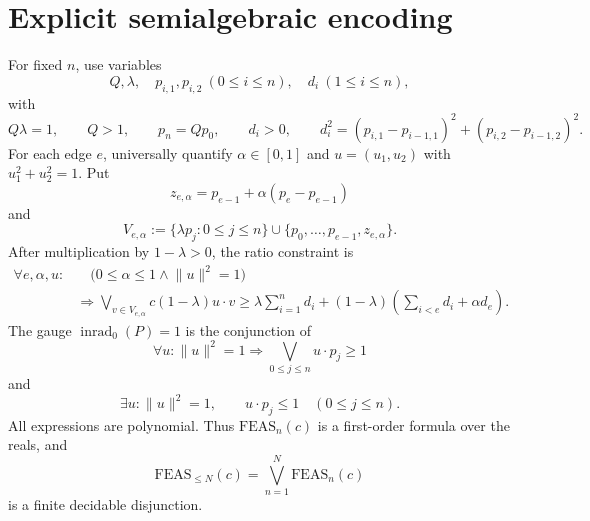 \documentclass[10pt,a4paper]{article}
\theoremstyle{definition}
\theoremstyle{remark}
\DeclareMathOperator{\inrad}{inrad}
\newcommand{\norm}[1]{\lVert #1\rVert}
\begin{document}
\section{Explicit semialgebraic encoding}
\label{app:semialgebraic}
For fixed $n$, use variables
\[
Q,\lambda,
\quad
p_{i,1},p_{i,2}\ (0\le i\le n),
\quad
d_i\ (1\le i\le n),
\]
with
\[
Q\lambda=1,
\qquad
Q>1,
\qquad
p_n=Qp_0,
\qquad
d_i>0,
\qquad
d_i^2=(p_{i,1}-p_{i-1,1})^2+(p_{i,2}-p_{i-1,2})^2.
\]
For each edge $e$, universally quantify $\alpha\in[0,1]$ and $u=(u_1,u_2)$ with $u_1^2+u_2^2=1$. Put
\[
z_{e,\alpha}=p_{e-1}+\alpha(p_e-p_{e-1})
\]
and
\[
V_{e,\alpha}:=
\{\lambda p_j:0\le j\le n\}
\cup
\{p_0,\ldots,p_{e-1},z_{e,\alpha}\}.
\]
After multiplication by $1-\lambda>0$, the ratio constraint is
\begin{align*}
\forall e,\alpha,u:
&\quad
\bigl(0\le\alpha\le1\wedge\norm{u}^2=1\bigr)\\
&\Longrightarrow
\bigvee_{v\in V_{e,\alpha}}
 c(1-\lambda)u\cdot v
\ge
\lambda\sum_{i=1}^n d_i
+(1-\lambda)\left(\sum_{i<e}d_i+\alpha d_e\right).
\end{align*}
The gauge $\inrad_0(P)=1$ is the conjunction of
\[
\forall u:\norm{u}^2=1
\Longrightarrow
\bigvee_{0\le j\le n}u\cdot p_j\ge1
\]
and
\[
\exists u:\norm{u}^2=1,
\qquad
u\cdot p_j\le1\quad(0\le j\le n).
\]
All expressions are polynomial. Thus $\mathrm{FEAS}_n(c)$ is a first-order formula over the reals, and
\[
\mathrm{FEAS}_{\le N}(c)=\bigvee_{n=1}^N\mathrm{FEAS}_n(c)
\]
is a finite decidable disjunction.
\end{document}
